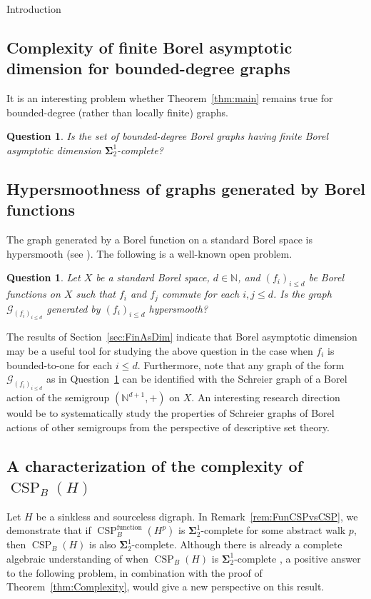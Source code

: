 \documentclass[psamsfonts]{amsart}
\newtheorem{quest}[thm]{Question}
\theoremstyle{definition}
\newcommand{\N}{\mathbb N}
\theoremstyle{remark}
\numberwithin{equation}{section}
\newcommand\mbf{\mathbf}
\newcommand\mcal{\mathcal}
\begin{document}
\begin{section}{Introduction}
\subsection{Complexity of finite Borel asymptotic dimension for bounded-degree graphs}
It is an interesting problem whether Theorem~\ref{thm:main} remains true for bounded-degree (rather than locally finite) graphs.

    \begin{quest}
        Is the set of bounded-degree Borel graphs having finite Borel asymptotic dimension $\mbf{\Sigma}^1_2$-complete?
    \end{quest}

\subsection{Hypersmoothness of graphs generated by Borel functions} The graph generated by a Borel function on a standard Borel space is hypersmooth (see \cite[Theorem~8.1]{djk1994}). The following is a well-known open problem.

    \begin{quest}
    \label{quest:CommFuncs}
        Let $X$ be a standard Borel space, $d \in \N$, and $(f_i)_{i \leq d}$ be Borel functions on $X$ such that $f_i$ and $f_j$ commute for each $i, j \leq d$.
        Is the graph $\mcal{G}_{(f_i)_{i \leq d}}$ generated by $(f_i)_{i \leq d}$ hypersmooth?
    \end{quest}

The results of Section~\ref{sec:FinAsDim} indicate that Borel asymptotic dimension may be a useful tool for studying the above question in the case when $f_i$ is bounded-to-one for each $i \leq d$.
Furthermore, note that any graph of the form $\mcal{G}_{(f_i)_{i \leq d}}$ as in Question~\ref{quest:CommFuncs} can be identified with the Schreier graph of a Borel action of the semigroup $(\N^{d + 1}, +)$ on $X$.
An interesting research direction would be to systematically study the properties of Schreier graphs of Borel actions of other semigroups from the perspective of descriptive set theory.

\subsection{A characterization of the complexity of $\operatorname{CSP}_B(H)$} Let $H$ be a sinkless and sourceless digraph.
In Remark~\ref{rem:FunCSPvsCSP}, we demonstrate that if $\operatorname{CSP}_B^{\operatorname{function}}(H^p)$ is $\mbf{\Sigma}^1_2$-complete for some abstract walk $p$, then $\operatorname{CSP}_B(H)$ is also $\mbf{\Sigma}^1_2$-complete.
Although there is already a complete algebraic understanding of when $\operatorname{CSP}_B(H)$ is $\mbf{\Sigma}^1_2$-complete \cite{bkn2009,thornton2022}, a positive answer to the following problem, in combination with the proof of Theorem~\ref{thm:Complexity}, would give a new perspective on this result.


\end{section}
\end{document}
